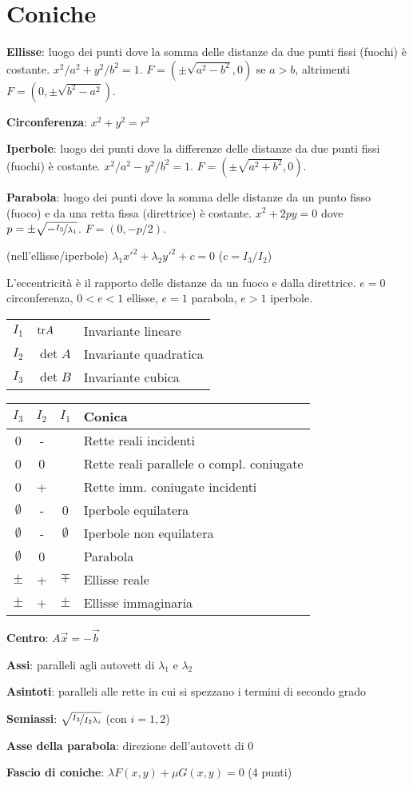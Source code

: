 \section{Coniche}

\textbf{Ellisse}: luogo dei punti dove la somma delle distanze da due punti fissi (fuochi) è costante. $x^2/a^2 + y^2/b^2 = 1$.
$F=(\pm\sqrt{a^2-b^2}, 0)$ se $a>b$, altrimenti $F=(0, \pm\sqrt{b^2-a^2})$.

\textbf{Circonferenza}: $x^2+y^2=r^2$

\textbf{Iperbole}: luogo dei punti dove la differenze delle distanze da due punti fissi (fuochi) è costante. $x^2/a^2 - y^2/b^2 = 1$.
$F=(\pm\sqrt{a^2+b^2}, 0)$.

\textbf{Parabola}: luogo dei punti dove la somma delle distanze da un punto fisso (fuoco) e da una retta fissa (direttrice) è costante. $x^2+2py=0$ dove $p=\pm \sqrt{-\nicefrac{I_3}{\lambda_1}}$.
$F=(0, -p/2)$.

(nell'ellisse/iperbole) $\lambda_1x'^2+\lambda_2y'^2+c=0$ ($c=I_3/I_2$)

L'eccentricità è il rapporto delle distanze da un fuoco e dalla direttrice. $e = 0$ circonferenza, $0 < e < 1$ ellisse, $e = 1$ parabola, $e > 1$ iperbole. 

\begin{tabular}{lll}
	$I_1$ & $\mathrm{tr} A$ & Invariante lineare \\
	$I_2$ & $\det A$ & Invariante quadratica \\
	$I_3$ & $\det B$ & Invariante cubica
\end{tabular}

\begin{tabular}{c|c|c|l}
	\boldmath$I_3$ & \boldmath$I_2$ & \boldmath$I_1$ & \textbf{Conica} \\
	\hline
	0     & -     &       & Rette reali incidenti \\
	0     & 0     &       & Rette reali parallele o compl. coniugate \\
	0     & +     &       & Rette imm. coniugate incidenti \\
	\hline
	$\emptyset$ & -     & 0     & Iperbole equilatera \\
	$\emptyset$ & -     & $\emptyset$ & Iperbole non equilatera \\
	$\emptyset$ & 0     &       & Parabola \\
	$\pm$ & +     & $\mp$ & Ellisse reale \\
	$\pm$ & +     & $\pm$ & Ellisse immaginaria \\
	\hline
\end{tabular}

\textbf{Centro}: $A\vec{x} = -\vec{b}$

\textbf{Assi}: paralleli agli autovett di $\lambda_1$ e $\lambda_2$

\textbf{Asintoti}: paralleli alle rette in cui si spezzano i termini di secondo grado

\textbf{Semiassi}: $\sqrt{\nicefrac{I_3}{I_2\lambda_i}}$ (con $i=1,2$)

\textbf{Asse della parabola}: direzione dell'autovett di 0

\textbf{Fascio di coniche}: $\lambda F(x,y) + \mu G(x,y) = 0$ (4 punti)
